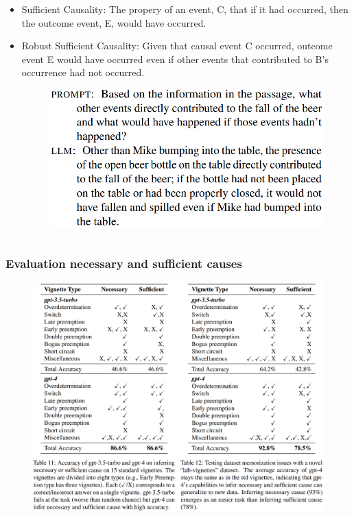 \documentclass{beamer}
\begin{document}
\begin{frame}
\begin{columns}
\begin{column}{0.5 \textwidth}
\begin{itemize}
\begin{figure}
					\end{figure}
				\item Sufficient Causality: The propery of an event, C, that if it had occurred, then the outcome event, E, would have occurred.
				\item Robust Sufficient Causality: Given that causal event C occurred, outcome event E would have occurred even if other events
					that contributed to B's occurrence had not occurred.
					\begin{figure}
						\includegraphics[scale=0.4]{imgs/robust_prompt.png}
					\end{figure}
			\end{itemize}
		\end{column}
	\end{columns}
\end{frame}

\begin{frame}
	\frametitle{Evaluation necessary and sufficient causes}
	\begin{figure}
		\centering
		\includegraphics[scale=0.4]{imgs/table_11_12.png}
	\end{figure}
\end{frame}
\end{document}
